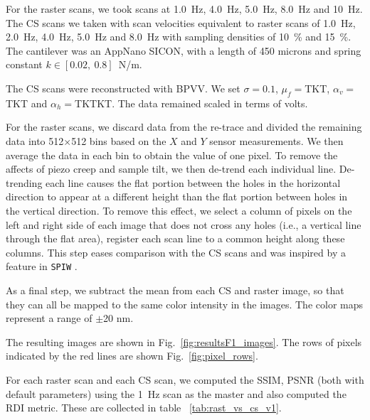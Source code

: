 \documentclass[twocolumn,oneside]{IEEEtran/IEEEtran}
\newcommand{\xc}{\ensuremath{X}\xspace}
\newcommand{\yc}{\ensuremath{Y}\xspace}
\begin{document}

For the raster scans, we took scans at 1.0~Hz, 4.0~Hz, 5.0~Hz, 8.0~Hz and
10~Hz.  The CS scans we taken with scan velocities equivalent to raster scans of 1.0~Hz,
2.0~Hz, 4.0~Hz, 5.0~Hz and 8.0~Hz with sampling densities of 10~\% and 15~\%.
The cantilever was an AppNano SICON, with a
length of 450 microns and spring constant $k\in[0.02,~0.8]$~N/m.

The CS scans were reconstructed with BPVV. We set
$\sigma = 0.1$, $\mu_f=$TKT, $\alpha_v=$TKT and $\alpha_h=$TKTKT. The data remained scaled in terms of volts.

For the raster scans, we discard data from the re-trace and divided the
remaining data into 512$\times$512 bins based on the \xc and \yc sensor
measurements. We then average the data in each bin to obtain the value of one
pixel. To remove the affects of piezo creep and sample tilt, we then de-trend
each individual line. De-trending each line causes the flat portion between the holes in the horizontal direction to appear at a different height than the flat portion between holes in the vertical direction. 
To remove this effect, we select a column of
pixels on the left and right side of each image that does not cross any holes
(i.e., a vertical line through the flat area), register each scan line to a
common height along these columns. This step eases comparison with the CS scans
and was inspired by a feature in \texttt{SPIW} \cite{spiw}.

As a final step, we subtract the mean from each CS and raster image, so that
they can all be mapped to the same color intensity in the images. The color maps
represent a range of $\pm$20 nm.


The resulting images are shown in Fig.~\ref{fig:resultsF1_images}. The rows of
pixels indicated by the red lines are shown Fig.~\ref{fig:pixel_rows}.


For each raster scan and each CS scan, we computed the SSIM, PSNR (both with
default parameters) using the 1~Hz scan as the master and also computed the RDI
metric. These are collected in table ~\ref{tab:rast_vs_cs_v1}.

%   
\end{document}
